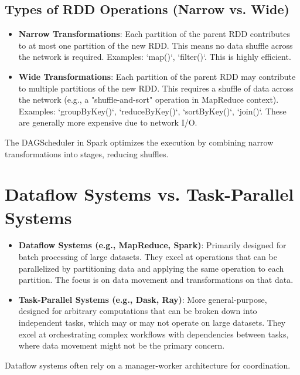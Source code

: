 \documentclass{article}
\begin{document}
\subsection*{Types of RDD Operations (Narrow vs. Wide)}
\begin{itemize}
    \item \textbf{Narrow Transformations}: Each partition of the parent RDD contributes to at most one partition of the new RDD. This means no data shuffle across the network is required. Examples: `map()`, `filter()`. This is highly efficient.
    \item \textbf{Wide Transformations}: Each partition of the parent RDD may contribute to multiple partitions of the new RDD. This requires a shuffle of data across the network (e.g., a "shuffle-and-sort" operation in MapReduce context). Examples: `groupByKey()`, `reduceByKey()`, `sortByKey()`, `join()`. These are generally more expensive due to network I/O.
\end{itemize}
The DAGScheduler in Spark optimizes the execution by combining narrow transformations into stages, reducing shuffles.

\section*{Dataflow Systems vs. Task-Parallel Systems}
\begin{itemize}
    \item \textbf{Dataflow Systems (e.g., MapReduce, Spark)}: Primarily designed for batch processing of large datasets. They excel at operations that can be parallelized by partitioning data and applying the same operation to each partition. The focus is on data movement and transformations on that data.
    \item \textbf{Task-Parallel Systems (e.g., Dask, Ray)}: More general-purpose, designed for arbitrary computations that can be broken down into independent tasks, which may or may not operate on large datasets. They excel at orchestrating complex workflows with dependencies between tasks, where data movement might not be the primary concern.
\end{itemize}
Dataflow systems often rely on a manager-worker architecture for coordination.
\end{document}
